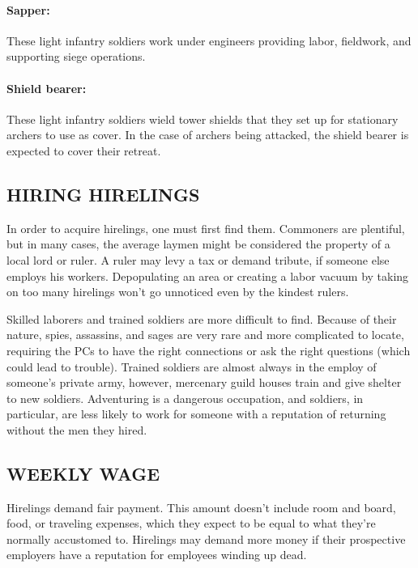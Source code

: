 \begin{multicols}{2}
\paragraph{Sapper:} These light infantry soldiers work under engineers providing labor, fieldwork, and supporting siege operations.

\paragraph{Shield bearer:}  These light infantry soldiers wield tower shields that they set up for stationary archers to use as cover.  In the case of archers being attacked, the shield bearer is expected to cover their retreat.

\subsection{HIRING HIRELINGS}

In order to acquire hirelings, one must first find them.  Commoners are plentiful, but in many cases, the average laymen might be considered the property of a local lord or ruler.  A ruler may levy a tax or demand tribute, if someone else employs his workers.  Depopulating an area or creating a labor vacuum by taking on too many hirelings won't go unnoticed even by the kindest rulers.  

Skilled laborers and trained soldiers are more difficult to find.  Because of their nature, spies, assassins, and sages are very rare and more complicated to locate, requiring the PCs to have the right connections or ask the right questions (which could lead to trouble).  Trained soldiers are almost always in the employ of someone's private army, however, mercenary guild houses train and give shelter to new soldiers.  Adventuring is a dangerous occupation, and soldiers, in particular, are less likely to work for someone with a reputation of returning without the men they hired.

\subsection{WEEKLY WAGE}

Hirelings demand fair payment.  This amount doesn't include room and board, food, or traveling expenses, which they expect to be equal to what they're normally accustomed to.  Hirelings may demand more money if their prospective employers have a reputation for employees winding up dead.


\end{multicols}
